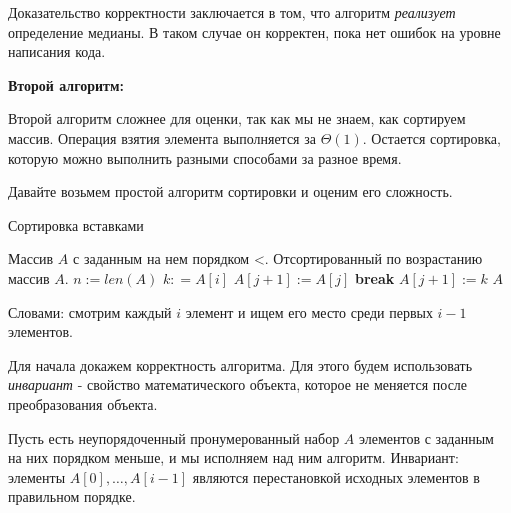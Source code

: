 \documentclass[../book.tex]{subfiles}
\begin{document}
	Доказательство корректности заключается в том, что алгоритм \textit{реализует} определение медианы. В таком случае он корректен, пока нет ошибок на уровне написания кода.
	
	\textbf{Второй алгоритм:}
	
	Второй алгоритм сложнее для оценки, так как мы не знаем, как сортируем массив. Операция взятия элемента выполняется за $\Theta(1)$. Остается сортировка, которую можно выполнить разными способами за разное время. 
	
	Давайте возьмем простой алгоритм сортировки и оценим его сложность.
	
	\begin{algorithm}[H]
		\caption{Сортировка вставками}
		\begin{algorithmic}[1]
			\Require Массив $A$ с заданным на нем порядком <.
			\Ensure Отсортированный по возрастанию массив $A$.
				\State $n:=len(A)$
					\State $k: = A[i]$
							\State $A[j+1] := A[j]$
						\Else
							\State \textbf{break}
						\EndIf
					\EndFor
					\State $A[j + 1] := k$
				\EndFor
				\State \Return $A$
			\EndFunction
		\end{algorithmic}
	\end{algorithm}
	
	Словами: смотрим каждый $i$ элемент и ищем его место среди первых $i-1$ элементов.
	
	Для начала докажем корректность алгоритма. Для этого будем использовать \textit{инвариант} - свойство математического объекта, которое не меняется после преобразования объекта. 
	\begin{theorem}
		Пусть есть неупорядоченный пронумерованный набор $A$ элементов с заданным на них порядком меньше, и мы исполняем над ним алгоритм. Инвариант: элементы $A[0], \ldots, A[i - 1]$ являются перестановкой исходных элементов в правильном порядке.
	\end{theorem}
	
\end{document}
